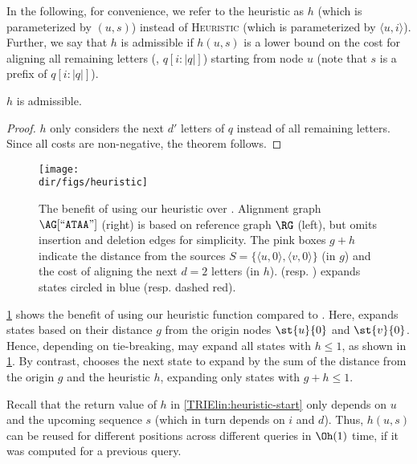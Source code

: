 In the following, for convenience, we refer to the heuristic as $h$ (which is
parameterized by $(u,s)$) instead of \textsc{Heuristic} (which is parameterized
by $\langle u, i \rangle$). Further, we say that $h$ is admissible if $h(u,s)$
is a lower bound on the cost for aligning all remaining letters (\ie,
$q[i{:}|q|]$) starting from node $u$ (note that $s$ is a prefix of
$q[i{:}|q|]$).

\begin{samepage}
\begin{thm} \label{TRIEthm:admissible}
	$h$ is admissible.
\end{thm}
\begin{proof}
$h$ only considers the next $d'$ letters of $q$ instead of all
remaining letters. Since all costs are non-negative, the theorem follows.
\end{proof}
\end{samepage}

\begin{figure}[t]
	\centering
	\texttt{[image: \\dir/figs/heuristic]}
	\caption[Toy example when \A is preferrable to \dijkstra]{The benefit of using our heuristic over \dijkstra. Alignment graph
	$\AG[``\texttt{ATAA}"]$ (right) is based on reference graph $\RG$ (left),
	but omits insertion and deletion edges for simplicity. The pink boxes $g+h$
	indicate the distance from the sources $S=\{\langle u,0 \rangle, \langle v,0
	\rangle \}$ (in $g$) and the cost of aligning the next $d=2$ letters (in
	$h$). \dijkstra (resp. \A) expands states circled in
	\textcolor{my-full-blue}{blue} (resp.
	\textcolor{my-full-red}{dashed red}).}
	\label{TRIEfig:heuristic-benefit}
\end{figure}

 \label{TRIEpara:heuristic-benefits}
\cref{TRIEfig:heuristic-benefit} shows the benefit of using our heuristic function
compared to \dijkstra. Here, \dijkstra expands states based on their distance
$g$ from the origin nodes $\st{u}{0}$ and $\st{v}{0}$. Hence, depending on
tie-breaking, \dijkstra may expand all states with $h \leq 1$, as shown in
\cref{TRIEfig:heuristic-benefit}. By contrast, \A chooses the next state to expand
by the sum of the distance from the origin $g$ and the heuristic $h$, expanding
only states with $g+h \leq 1$.

 \label{TRIEpara:memoization}
Recall that the return value of $h$ in \cref{TRIElin:heuristic-start} only depends
on $u$ and the upcoming sequence $s$ (which in turn depends on $i$ and $d$).
Thus, $h(u,s)$ can be reused for different positions across different queries in
$\Oh(1)$ time, if it was computed for a previous query.

